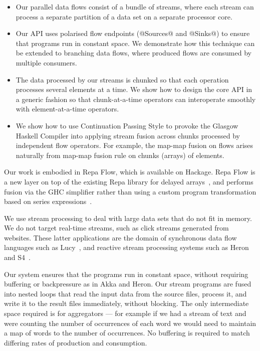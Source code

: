 \begin{itemize}
\item Our parallel data flows consist of a bundle of streams, where each stream can process a separate partition of a data set on a separate processor core.

\item Our API uses polarised flow endpoints (@Sources@ and @Sinks@) to ensure that programs run in constant space. We demonstrate how this technique can be extended to branching data flows, where produced flows are consumed by multiple consumers.

\item The data processed by our streams is chunked so that each operation processes several elements at a time. We show how to design the core API in a generic fashion so that chunk-at-a-time operators can interoperate smoothly with element-at-a-time operators.

\item We show how to use Continuation Passing Style to provoke the Glasgow Haskell Compiler into applying stream fusion across chunks processed by independent flow operators. For example, the map-map fusion on flows arises naturally from map-map fusion rule on chunks (arrays) of elements.
\end{itemize}

Our work is embodied in Repa Flow, which is available on Hackage. Repa Flow is a new layer on top of the existing Repa library for delayed arrays~\cite{Lippmeier:Guiding}, and performs fusion via the GHC simplifier rather than using a custom program transformation based on series expressions~\cite{Lippmeier:DataFlow}.

We use stream processing to deal with large data sets that do not fit in memory. We do not target real-time streams, such as click streams generated from websites. These latter applications are the domain of synchronous data flow languages such as Lucy~\cite{Mandel:Lucy}, and reactive stream processing systems such as Heron~\cite{Kulkarn:Heron} and S4~\cite{Neumeyer:S4}. 

Our system ensures that the programs run in constant space, without requiring buffering or backpressure as in Akka and Heron. Our stream programs are fused into nested loops that read the input data from the source files, process it, and write it to the result files immediately, without blocking. The only intermediate space required is for aggregators --- for example if we had a stream of text and were counting the number of occurrences of each word we would need to maintain a map of words to the number of occurrences. No buffering is required to match differing rates of production and consumption.

